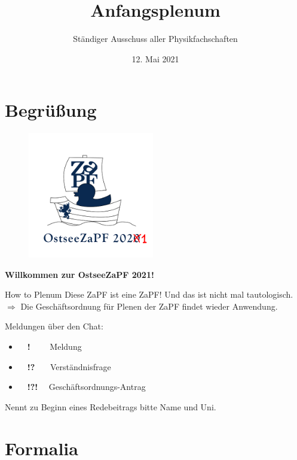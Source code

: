 \documentclass[compress, aspectratio=169]{beamer}
\title[Anfangsplenum]{Anfangsplenum}
\author{Ständiger Ausschuss aller Physikfachschaften}
\institute[Zusammenkunft aller Physikfachschaften]
\date{12. Mai 2021}
\begin{document}
	
	\section{Begrüßung}
	
	{
		\begin{frame}
			\begin{figure}
				\centering
				\includegraphics[height=5.5cm]{LOGO.png}
			\end{figure}
			\centering
			\textbf{Willkommen zur OstseeZaPF 2021!}
		\end{frame}
	}
	
	\begin{frame}{How to Plenum}
		Diese ZaPF ist eine ZaPF! Und das ist nicht mal tautologisch.\\
		$\Rightarrow$ Die Geschäftsordnung für Plenen der ZaPF findet wieder Anwendung.
		
		\vspace{.5cm}
		Meldungen über den Chat:
		\begin{itemize}
			\item$\quad$\textbf{!}$\quad$ \ \ Meldung
			\item$\quad$\textbf{!?}$\quad$ \ Verständnisfrage
			\item$\quad$\textbf{!?!}$\quad$ Geschäftsordnungs-Antrag
		\end{itemize}
		\vspace{.5cm}
		Nennt zu Beginn eines Redebeitrags bitte Name und Uni.
	\end{frame}
	
	\section{Formalia}
	
\end{document}
